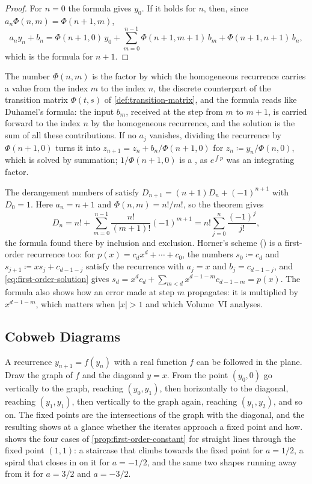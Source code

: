 \begin{proof}
For $n=0$ the formula gives $y_0$. If it holds for $n$, then, since $a_n\Phi(n,m)=\Phi(n+1,m)$,
\[
a_ny_n+b_n=\Phi(n+1,0)\,y_0+\sum_{m=0}^{n-1}\Phi(n+1,m+1)\,b_m+\Phi(n+1,n+1)\,b_n ,
\]
which is the formula for $n+1$.
\end{proof}

The number $\Phi(n,m)$ is the factor by which the homogeneous recurrence carries a value from the index $m$ to the index $n$, the discrete counterpart of the transition matrix $\Phi(t,s)$ of \cref{def:transition-matrix}, and the formula reads like Duhamel's formula: the input $b_m$, received at the step from $m$ to $m+1$, is carried forward to the index $n$ by the homogeneous recurrence, and the solution is the sum of all these contributions. If no $a_j$ vanishes, dividing the recurrence by $\Phi(n+1,0)$ turns it into $z_{n+1}=z_n+b_n/\Phi(n+1,0)$ for $z_n\coloneqq y_n/\Phi(n,0)$, which is solved by summation; $1/\Phi(n+1,0)$ is a , as $e^{\int p}$ was an integrating factor.

The derangement numbers of  satisfy $D_{n+1}=(n+1)D_n+(-1)^{n+1}$ with $D_0=1$. Here $a_n=n+1$ and $\Phi(n,m)=n!/m!$, so the theorem gives
\[
D_n=n!+\sum_{m=0}^{n-1}\frac{n!}{(m+1)!}(-1)^{m+1}=n!\sum_{j=0}^n\frac{(-1)^j}{j!},
\]
the formula found there by inclusion and exclusion. Horner's scheme () is a first-order recurrence too: for $p(x)=c_dx^d+\cdots+c_0$, the numbers $s_0\coloneqq c_d$ and $s_{j+1}\coloneqq xs_j+c_{d-1-j}$ satisfy the recurrence with $a_j=x$ and $b_j=c_{d-1-j}$, and \eqref{eq:first-order-solution} gives $s_d=x^dc_d+\sum_{m<d}x^{d-1-m}c_{d-1-m}=p(x)$. The formula also shows how an error made at step $m$ propagates: it is multiplied by $x^{d-1-m}$, which matters when $|x|>1$ and which Volume~VI analyses.

\subsection{Cobweb Diagrams}

A recurrence $y_{n+1}=f(y_n)$ with a real function $f$ can be followed in the plane. Draw the graph of $f$ and the diagonal $y=x$. From the point $(y_0,0)$ go vertically to the graph, reaching $(y_0,y_1)$, then horizontally to the diagonal, reaching $(y_1,y_1)$, then vertically to the graph again, reaching $(y_1,y_2)$, and so on. The fixed points are the intersections of the graph with the diagonal, and the resulting  shows at a glance whether the iterates approach a fixed point and how.  shows the four cases of \cref{prop:first-order-constant} for straight lines through the fixed point $(1,1)$: a staircase that climbs towards the fixed point for $a=1/2$, a spiral that closes in on it for $a=-1/2$, and the same two shapes running away from it for $a=3/2$ and $a=-3/2$.


